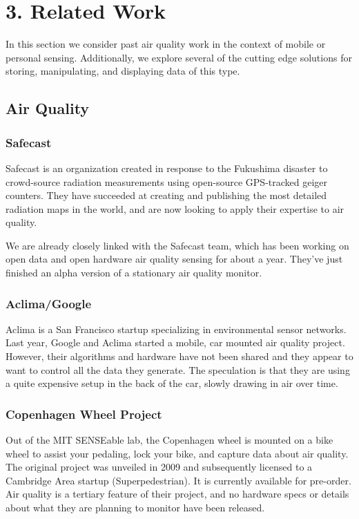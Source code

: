 \chapter{3. Related Work}

In this section we consider past air quality work in the context of mobile or personal sensing.  Additionally, we explore several of the cutting edge solutions for storing, manipulating, and displaying data of this type.

\section{Air Quality}

\subsection{Safecast}

Safecast \cite{safecast} is an organization created in response to the Fukushima disaster to crowd-source radiation measurements using open-source GPS-tracked geiger counters.  They have succeeded at creating and publishing the most detailed radiation maps in the world, and are now looking to apply their expertise to air quality.

We are already closely linked with the Safecast team, which has been working on open data and open hardware air quality sensing for about a year.  They've just finished an alpha version of a stationary air quality monitor.

\subsection{Aclima/Google}

Aclima \cite{aclima} is a San Francisco startup specializing in environmental sensor networks.  Last year, Google and Aclima started a mobile, car mounted air quality project.  However, their algorithms and hardware have not been shared and they appear to want to control all the data they generate.  The speculation is that they are using a quite expensive setup in the back of the car, slowly drawing in air over time.  

\subsection{Copenhagen Wheel Project}

Out of the MIT SENSEable lab, the Copenhagen wheel \cite{wheel} is mounted on a bike wheel to assist your pedaling, lock your bike, and capture data about air quality.  The original project was unveiled in 2009 and subsequently licensed to a Cambridge Area startup (Superpedestrian).  It is currently available for pre-order.  Air quality is a tertiary feature of their project, and no hardware specs or details about what they are planning to monitor have been released.

